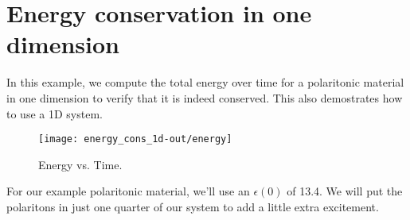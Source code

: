 \begin{comment}
#include <stdio.h>
#include <stdlib.h>
#include <signal.h>
\end{comment}

\section{Energy conservation in one dimension}

In this example, we compute the total energy over time for a polaritonic
material in one dimension to verify that it is indeed conserved.  This also
demostrates how to use a 1D system.

\begin{figure}
\label{econs_1d}
\caption{Energy vs. Time.}
\texttt{[image: energy\_cons\_1d-out/energy]}
\end{figure}

\begin{comment}
#include "meep.h"

const double a = 10;
\end{comment}

For our example polaritonic material, we'll use an $\epsilon(0)$ of 13.4.
We will put the polaritons in just one quarter of our system to add a
little extra excitement.

